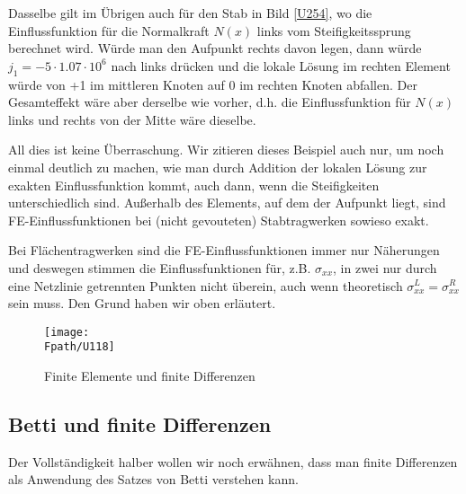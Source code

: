 {{{{{{{Dasselbe gilt im \"{U}brigen auch f\"{u}r den Stab in Bild \ref{U254}, wo die Einflussfunktion f\"{u}r die Normalkraft $N(x)$ links vom Steifigkeitssprung berechnet wird. W\"{u}rde man den Aufpunkt rechts davon legen, dann w\"{u}rde $j_1 = - 5 \cdot 1.07 \cdot 10^6$ nach links dr\"{u}cken und die lokale L\"{o}sung im rechten Element w\"{u}rde von +1 im mittleren Knoten auf 0 im rechten Knoten abfallen. Der Gesamteffekt w\"{a}re aber derselbe wie vorher, d.h. die Einflussfunktion f\"{u}r $N(x)$ links und rechts von der Mitte w\"{a}re dieselbe.

All dies ist keine \"{U}berraschung. Wir zitieren dieses Beispiel auch nur, um noch einmal deutlich zu machen, wie man durch Addition der lokalen L\"{o}sung zur exakten Einflussfunktion kommt, auch dann, wenn die Steifigkeiten unterschiedlich sind. Au{\ss}erhalb des
Elements, auf dem der Aufpunkt liegt, sind FE-Einflussfunktionen bei (nicht gevouteten) Stabtragwerken sowieso exakt.


Bei Fl\"{a}chentragwerken sind die FE-Einflussfunktionen immer nur N\"{a}herungen und deswegen stimmen die Einflussfunktionen f\"{u}r, z.B. $\sigma_{xx}$, in zwei nur durch eine Netzlinie getrennten Punkten nicht \"{u}berein, auch wenn theoretisch $\sigma_{xx}^L = \sigma_{xx}^R$ sein muss. Den Grund haben wir oben erl\"{a}utert.

\begin{figure}
\centering
{\texttt{[image: \\Fpath/U118]}}
  \caption{Finite Elemente und finite Differenzen}
  \label{U118}
\end{figure}



{\textcolor{blau2}{\subsection{Betti und finite Differenzen}}
Der Vollst\"{a}ndigkeit halber wollen wir noch erw\"{a}hnen, dass man finite Differenzen als Anwendung des Satzes von Betti verstehen kann.

}}}}}}}}
